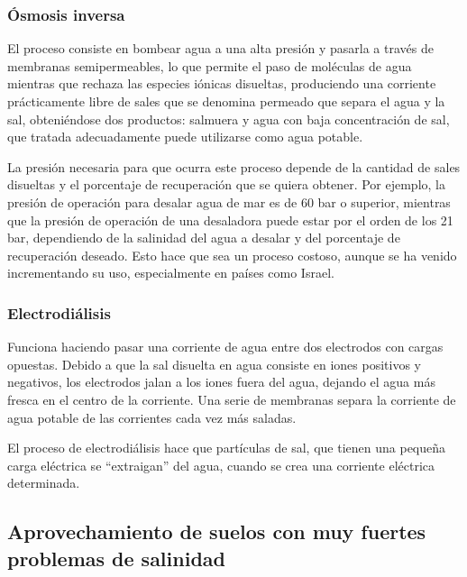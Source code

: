 \subsubsection{Ósmosis inversa} 
El proceso consiste en bombear agua a una alta presión y pasarla a través de membranas semipermeables, lo que permite el paso de moléculas de agua mientras que rechaza las especies iónicas disueltas, produciendo una corriente prácticamente libre de sales que se denomina permeado que separa el agua y la sal, obteniéndose dos productos: salmuera y agua con baja concentración de sal, que tratada adecuadamente puede utilizarse como agua potable.

La presión necesaria para que ocurra este proceso depende de la cantidad de sales disueltas y el porcentaje de recuperación que se quiera obtener. Por ejemplo, la presión de operación para desalar agua de mar es de 60 bar o superior, mientras que la presión de operación de una desaladora puede estar por el orden de los 21 bar, dependiendo de la salinidad del agua a desalar y del porcentaje de recuperación deseado. Esto hace que sea un proceso costoso, aunque se ha venido incrementando su uso, especialmente en países como Israel.

\subsubsection{Electrodiálisis} 
Funciona haciendo pasar una corriente de agua entre dos electrodos con cargas opuestas. Debido a que la sal disuelta en agua consiste en iones positivos y negativos, los electrodos jalan a los iones fuera del agua, dejando el agua más fresca en el centro de la corriente. Una serie de membranas separa la corriente de agua potable de las corrientes cada vez más saladas.

El proceso de electrodiálisis hace que partículas de sal, que tienen una pequeña carga eléctrica se “extraigan” del agua, cuando se crea una corriente eléctrica determinada.

\subsection{Aprovechamiento de suelos con muy fuertes problemas de salinidad} 

